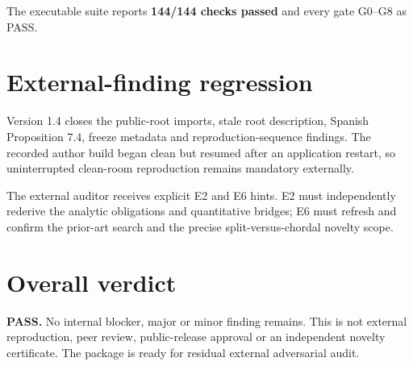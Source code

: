 \documentclass[11pt]{article}
\begin{document}
The executable suite reports \textbf{144/144 checks passed} and every gate G0--G8 as PASS.

\section{External-finding regression}
Version 1.4 closes the public-root imports, stale root description, Spanish
Proposition 7.4, freeze metadata and reproduction-sequence findings. The recorded
author build began clean but resumed after an application restart, so uninterrupted
clean-room reproduction remains mandatory externally.

The external auditor receives explicit E2 and E6 hints. E2 must independently
rederive the analytic obligations and quantitative bridges; E6 must refresh and
confirm the prior-art search and the precise split-versus-chordal novelty scope.

\section{Overall verdict}
\textbf{PASS.} No internal blocker, major or minor finding remains. This is not
external reproduction, peer review, public-release approval or an independent
novelty certificate. The package is ready for residual external adversarial audit.
\end{document}
